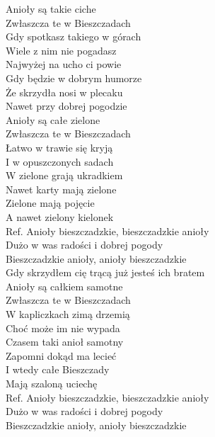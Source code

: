 
Anioły są takie ciche\tab{} \\
Zwłaszcza te w Bieszczadach \tab{}\\
Gdy spotkasz takiego w górach\tab{} \\
Wiele z nim nie pogadasz \tab{}\\
Najwyżej na ucho ci powie \tab{}\\
Gdy będzie w dobrym humorze \\
Że skrzydła nosi w plecaku \\
Nawet przy dobrej pogodzie \tab{}\\
\hops
Anioły są całe zielone \\
Zwłaszcza te w Bieszczadach \\
Łatwo w trawie się kryją \\
I w opuszczonych sadach \\
W zielone grają ukradkiem \\
Nawet karty mają zielone \\
Zielone mają pojęcie \\
A nawet zielony kielonek \\
\hops
Ref. Anioły bieszczadzkie, bieszczadzkie anioły  \\
 Dużo w was radości i dobrej pogody \tab{}\\
 Bieszczadzkie anioły, anioły bieszczadzkie  \\
 Gdy skrzydłem cię trącą już jesteś ich bratem \\
\hops
Anioły są całkiem samotne \\
Zwłaszcza te w Bieszczadach \\
W kapliczkach zimą drzemią \\
Choć może im nie wypada \\
Czasem taki anioł samotny \\
Zapomni dokąd ma lecieć \\
I wtedy całe Bieszczady \\
Mają szaloną uciechę \\
\hops
Ref. Anioły bieszczadzkie, bieszczadzkie anioły \\
 Dużo w was radości i dobrej pogody \\
 Bieszczadzkie anioły, anioły bieszczadzkie \\
